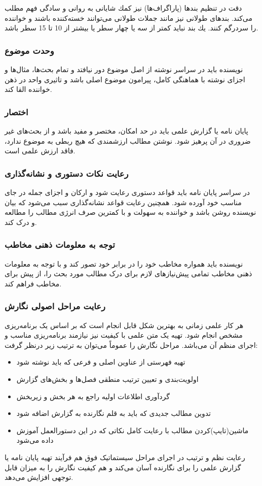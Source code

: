       دقت در تنظیم بندها (پاراگراف‌ها) نیز كمك شایانی به روانی و سادگی فهم مطلب می‌كند‌.‌ بندهای طولانی نیز مانند جملات طولانی می‌توانند خسته‌كننده باشند و خواننده را سردرگم كنند‌.‌ یك بند نباید کمتر از سه یا چهار سطر یا بیشتر از 10 تا 15 سطر باشد.‌ 
      
\subsubsection{وحدت موضوع}
نویسنده باید در سراسر نوشته از اصل موضوع دور نیافتد و تمام بحث‌ها، مثال‌ها و اجزای نوشته با هماهنگی كامل، پیرامون موضوع اصلی باشد و تاثیری واحد در ذهن خواننده القا كند. 
\subsubsection{ اختصار}
پایان نامه یا گزارش علمی باید در حد امكان، مختصر و مفید باشد و از بحث‌های غیر ضروری در آن پرهیز شود. نوشتن مطالب ارزشمندی كه هیچ ربطی به موضوع ندارد، فاقد ارزش علمی است.
\subsubsection{رعایت نكات دستوری و نشانه‌گذاری}
در سراسر پایان نامه باید قواعد دستوری رعایت شود و اركان و اجزای جمله در جای مناسب خود آورده شود. همچنین رعایت قواعد نشانه‌گذاری سبب می‌شود كه بیان نویسنده روشن باشد و خواننده به سهولت و با کمترین صرف انرژی مطالب را مطالعه و درک كند.
\subsubsection{توجه به معلومات ذهنی مخاطب}
نویسنده باید همواره مخاطب خود را در برابر خود تصور كند و با توجه به معلومات ذهنی مخاطب  تمامی پیش‌نیازهای لازم برای درک مطالب مورد بحث را، از پیش برای مخاطب فراهم كند.
\subsubsection{رعایت مراحل اصولی نگارش}
هر کار علمی زمانی به بهترین شکل قابل انجام است که بر اساس یک برنامه‌ریزی مشخص انجام شود. تهیه یک متن علمی با کیفیت نیز نیازمند برنامه‌ریزی مناسب و اجرای منظم آن می‌باشد. مراحل نگارش را عموماً می‌توان به ترتیب زیر درنظر گرفت:
\begin{itemize}
\item 
	تهیه فهرستی از عناوین اصلی و فرعی که باید نوشته شود
\item 
اولویت‌بندی و تعیین ترتیب منطقی فصل‌ها و بخش‌های گزارش
\item
گردآوری اطلاعات اولیه راجع به هر بخش و زیربخش
\item
تدوین مطالب جدیدی که باید به قلم نگارنده به گزارش اضافه شود
\item
ماشین‌(تایپ)كردن مطالب با رعایت کامل نکاتی که در این دستورالعمل آموزش داده می‌شود
\end{itemize}	
رعایت نظم و ترتیب در اجرای مراحل سیستماتیک فوق هم فرآیند تهیه پایان نامه یا گزارش علمی را برای نگارنده آسان می‌کند و هم کیفیت نگارش را به میزان قابل توجهی افزایش می‌دهد.
